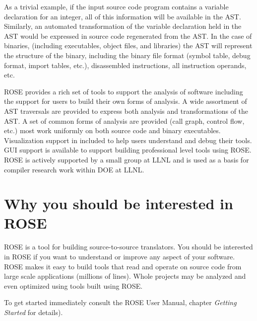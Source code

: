    As a trivial example, if the input source code program contains a variable declaration
for an integer, all of this information will be available in the AST.
Similarly, an automated transformation of the variable declaration 
held in the AST would be expressed in source code regenerated from the 
AST.  In the case of binaries, (including executables, object files, and libraries)
the AST will represent the structure of the binary, including the 
binary file format (symbol table, debug format, import tables, etc.), 
disassembled instructions, all instruction operands, etc.

  ROSE provides a rich set of tools to support the analysis of 
software including the support for users to build their own forms
of analysis.  A wide assortment of AST traversals are provided
to express both analysis and transformations of the AST. A set of
common forms of analysis are provided (call graph, control flow, etc.)
most work uniformly on both source code and binary executables.
Visualization support in included to help users understand and debug
their tools.  GUI support is available to support building professional
level tools using ROSE. ROSE is actively supported by a small
group at LLNL and is used as a basis for compiler research work within 
DOE at LLNL.

\section{Why you should be interested in ROSE}
ROSE is a tool for building source-to-source translators.
You should be interested in ROSE if you want to 
understand or improve any aspect of your software. ROSE
makes it easy to build tools that read and operate on source code
from large scale applications (millions of lines).  Whole projects
may be analyzed and even optimized using tools built using ROSE.

To get started immediately consult the ROSE User Manual, chapter
{\em Getting Started} for details).

